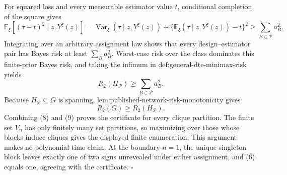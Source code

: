 For squared loss and every measurable estimator value \(t\), conditional completion of the square gives
\[
\mathbb E_{\xi}\!\left[(\tau-t)^2\mid z,Y^{\xi}(z)\right]
=\operatorname{Var}_{\xi}(\tau\mid z,Y^{\xi}(z))
+\{\mathbb E_{\xi}(\tau\mid z,Y^{\xi}(z))-t\}^2
\geq\sum_{B\in\mathcal P}a_B^2.
\tag{7}
\]
Integrating over an arbitrary assignment law shows that every design--estimator pair has Bayes risk at least \(\sum_Ba_B^2\).  Worst-case risk over the class dominates this finite-prior Bayes risk, and taking the infimum in \(\text{def:general-dte-minimax-risk}\) yields
\[
R_2(H_{\mathcal P})\geq\sum_{B\in\mathcal P}a_B^2.
\tag{8}
\]
Because \(H_{\mathcal P}\subseteq G\) is spanning, \(\text{lem:published-network-risk-monotonicity}\) gives
\[
R_2(G)\geq R_2(H_{\mathcal P}).
\tag{9}
\]
Combining (8) and (9) proves the certificate for every clique partition.  The finite set \(V_n\) has only finitely many set partitions, so maximizing over those whose blocks induce cliques gives the displayed finite enumeration.  This argument makes no polynomial-time claim.  At the boundary \(n=1\), the unique singleton block leaves exactly one of two signs unrevealed under either assignment, and (6) equals one, agreeing with the certificate. \(\square\)